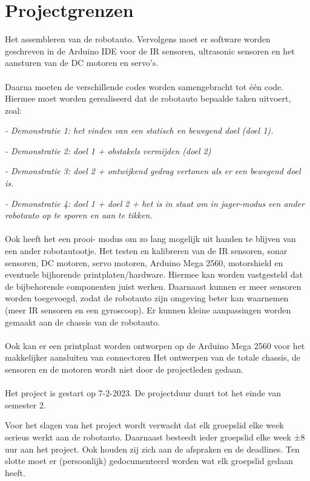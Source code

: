 \section{Projectgrenzen}
Het assembleren van de robotauto. Vervolgens moet er software worden geschreven in de Arduino IDE voor de IR sensoren, ultrasonic sensoren en het aansturen van de DC motoren en servo’s.
\\\\
Daarna moeten de verschillende codes worden samengebracht tot één code. Hiermee moet worden gerealiseerd dat de robotauto bepaalde taken uitvoert, zoal:

\textit{- Demonstratie 1: het vinden van een statisch en bewegend doel (doel 1).}

\textit{- Demonstratie 2: doel 1 + obstakels vermijden (doel 2)}

\textit{- Demonstratie 3: doel 2 + ontwijkend gedrag vertonen als er een bewegend doel is.}

\textit{- Demonstratie 4: doel 1 + doel 2 + het is in staat om in jager-modus een ander robotauto op te sporen en aan te tikken.}
\\\\
Ook heeft het een prooi- modus om zo lang mogelijk uit handen te blijven van een ander robotautootje.
Het testen en kalibreren van de IR sensoren, sonar sensoren, DC motoren, servo motoren, Arduino Mega 2560, motorshield en eventuele bijhorende printplaten/hardware. Hiermee kan worden vastgesteld dat de bijbehorende componenten juist werken. Daarnaast kunnen er meer sensoren worden toegevoegd, zodat de robotauto zijn omgeving beter kan waarnemen (meer IR sensoren en een gyroscoop). Er kunnen kleine aanpassingen worden gemaakt aan de chassis van de robotauto.
\\\\
Ook kan er een printplaat worden ontworpen op de Arduino Mega 2560 voor het makkelijker aansluiten van connectoren
Het ontwerpen van de totale chassis, de sensoren en de motoren wordt niet door de projectleden gedaan.
\\\\
Het project is gestart op 7-2-2023. De projectduur duurt tot het einde van semester 2.

Voor het slagen van het project wordt verwacht dat elk groepslid elke week serieus werkt aan de robotauto. Daarnaast besteedt ieder groepslid elke week ±8 uur aan het project. Ook houden zij zich aan de afspraken en de deadlines. Ten slotte moet er (persoonlijk) gedocumenteerd worden wat elk groepslid gedaan heeft.
